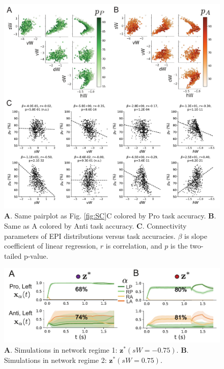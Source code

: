 \documentclass[11pt]{article}
\begin{document}
\begin{figure}
\begin{center}
\includegraphics[scale=0.9]{figures/figSC1/figSC1.pdf}
\end{center}
\caption{\textbf{A}. Same pairplot as Fig. \ref{fig:SC}C colored by Pro task accuracy.  
\textbf{B}. Same as A colored by Anti task accuracy.  
\textbf{C}. Connectivity parameters of EPI distributions versus task accuracies.  $\beta$ is slope coefficient of linear regression, $r$ is correlation, and $p$ is the two-tailed p-value.
}
\label{fig:SC1}
\end{figure}

\begin{figure}
\begin{center}
\includegraphics[scale=1.]{figures/figSC2/figSC2.pdf}
\end{center}
\caption{
\textbf{A}. Simulations in network regime 1: $\mathbf{z}^*(sW=-0.75)$.
\textbf{B}. Simulations in network regime 2: $\mathbf{z}^*(sW=0.75)$.
}
\label{fig:SC2}
\end{figure}
\end{document}
